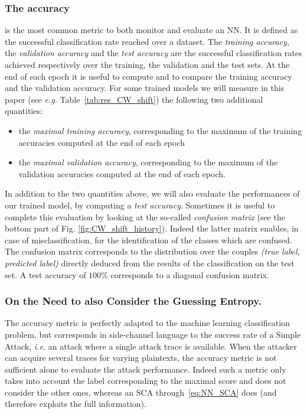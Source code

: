 \subsubsection{The accuracy} is the most common metric to both monitor and evaluate an NN. It is defined as the successful classification rate reached over a dataset. The {\em training accuracy}, the \emph{validation accuracy} and the \emph{test accuracy} are the successful classification rates achieved respectively over the training, the validation and the test sets. At the end of each epoch it is useful to compute and to compare the training accuracy and the validation accuracy. For some trained models we will measure in this paper (see \emph{e.g.} Table~\ref{tab:res_CW_shift}) the following two additional quantities: 
\begin{itemize}
\item the \emph{maximal training accuracy}, corresponding to the maximum of the training accuracies computed at the end of each epoch
\item the \emph{maximal validation accuracy}, corresponding to the maximum of the validation accuracies computed at the end of each epoch.
\end{itemize}
In addition to the two quantities above, we will also evaluate the performances of our trained model, by computing a \emph{test accuracy}. Sometimes it is useful to complete this evaluation by looking at the so-called \emph{confusion matrix} (see the bottom part of Fig. \ref{fig:CW_shift_history}). Indeed the latter matrix enables, in case of misclassification, for the identification of the classes which are confused. The confusion matrix corresponds to the distribution over the couples \emph{(true label, predicted label)} directly deduced from the results of the classification on the test set. A test accuracy of $100\%$ corresponds to a diagonal confusion matrix.\\

\subsubsection{On the Need to also Consider the Guessing Entropy.} The accuracy metric is perfectly adapted to the machine learning classification problem, but corresponds in side-channel language to the success rate of a Simple Attack, \emph{i.e.} an attack where a single attack trace is available. When the attacker can acquire several traces for varying plaintexts, the accuracy metric is not sufficient alone to evaluate the attack performance.
Indeed such a metric only takes into account the label corresponding to the maximal score and does not consider the other ones, whereas an SCA through~\eqref{eq:NN_SCA} does (and therefore exploits the full information).

